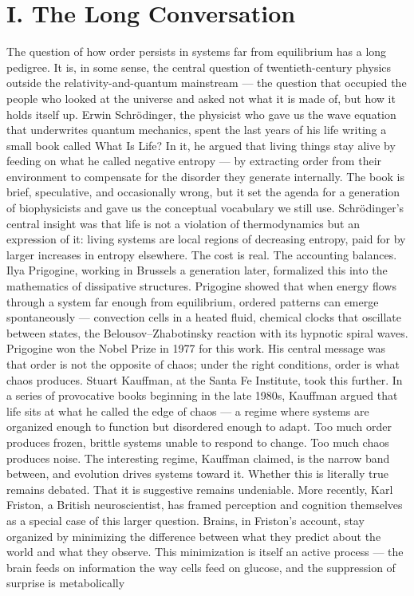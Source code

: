 \documentclass[12pt]{article}
\begin{document}
\section*{I. The Long Conversation}

The question of how order persists in systems far from equilibrium has a long pedigree. It is, in some sense, the central question of twentieth-century physics outside the relativity-and-quantum mainstream --- the question that occupied the people who looked at the universe and asked not what it is made of, but how it holds itself up. Erwin Schr{\"o}dinger, the physicist who gave us the wave equation that underwrites quantum mechanics, spent the last years of his life writing a small book called What Is Life? In it, he argued that living things stay alive by feeding on what he called negative entropy --- by extracting order from their environment to compensate for the disorder they generate internally. The book is brief, speculative, and occasionally wrong, but it set the agenda for a generation of biophysicists and gave us the conceptual vocabulary we still use. Schr{\"o}dinger's central insight was that life is not a violation of thermodynamics but an expression of it: living systems are local regions of decreasing entropy, paid for by larger increases in entropy elsewhere. The cost is real. The accounting balances. Ilya Prigogine, working in Brussels a generation later, formalized this into the mathematics of dissipative structures. Prigogine showed that when energy flows through a system far enough from equilibrium, ordered patterns can emerge spontaneously --- convection cells in a heated fluid, chemical clocks that oscillate between states, the Belousov--Zhabotinsky reaction with its hypnotic spiral waves. Prigogine won the Nobel Prize in 1977 for this work. His central message was that order is not the opposite of chaos; under the right conditions, order is what chaos produces. Stuart Kauffman, at the Santa Fe Institute, took this further. In a series of provocative books beginning in the late 1980s, Kauffman argued that life sits at what he called the edge of chaos --- a regime where systems are organized enough to function but disordered enough to adapt. Too much order produces frozen, brittle systems unable to respond to change. Too much chaos produces noise. The interesting regime, Kauffman claimed, is the narrow band between, and evolution drives systems toward it. Whether this is literally true remains debated. That it is suggestive remains undeniable. More recently, Karl Friston, a British neuroscientist, has framed perception and cognition themselves as a special case of this larger question. Brains, in Friston's account, stay organized by minimizing the difference between what they predict about the world and what they observe. This minimization is itself an active process --- the brain feeds on information the way cells feed on glucose, and the suppression of surprise is metabolically
\end{document}
